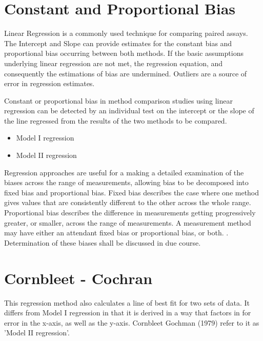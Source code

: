 \documentclass[12pt, a4paper]{report}
\theoremstyle{plain}
\theoremstyle{definition}
\theoremstyle{remark}
\begin{document}
\section{Constant and Proportional Bias}

Linear Regression is a commonly used technique for comparing paired assays. The Intercept and Slope can provide estimates for the constant bias and proportional bias occurring between both methods. If the basic assumptions underlying linear regression are not met, the regression equation, and consequently the estimations
of bias are undermined. Outliers are a source of error in regression estimates.

Constant or proportional bias in method comparison studies using linear regression can be detected by an individual test on the intercept or the slope of the line regressed from the results of the two methods to be compared.

\begin{itemize}
	\item Model I regression
	\item Model II regression
\end{itemize}

Regression approaches are useful for a making a detailed examination of the biases across the range of measurements, allowing bias to be decomposed into fixed bias and proportional bias. Fixed bias describes the case where one method gives values that are consistently different to the other across the whole range. Proportional
bias describes the difference in measurements getting progressively greater, or smaller, across the range of measurements. A measurement method may have either an attendant fixed bias or proportional bias, or both. \citep{ludbrook}. Determination of these biases shall be discussed in due course.


\section{Cornbleet - Cochran }
This regression method also calculates a line of best fit for two sets of data. It differs from Model I regression in that it is derived in a way that factors in for error in the x-axis, as well as the y-axis. Cornbleet Gochman (1979) refer to it as 'Model II regression'.
\end{document}
